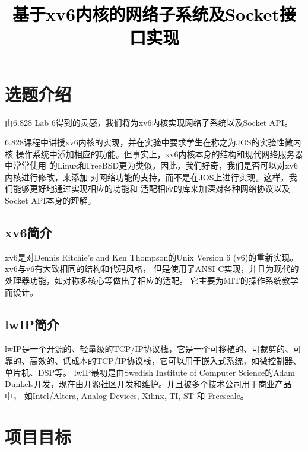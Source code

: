 \documentclass[a4paper,twoside]{article}
\newcommand{\PaperTitle}{基于xv6内核的网络子系统及Socket接口实现}  %
\begin{document}
\newpage

\title{
	\Large{\textcolor{black}{\PaperTitle}}
}
	
	
\maketitle
	
\tableofcontents
 
\newpage
\setcounter{page}{1}

\begin{spacing}{1.2}

\section{选题介绍}

由6.828 Lab 6\cite{kaashoek20066}得到的灵感，我们将为xv6内核实现网络子系统以及Socket API。

6.828课程中讲授xv6内核\cite{cox2011xv6}的实现，并在实验中要求学生在称之为JOS的实验性微内核
操作系统中添加相应的功能。但事实上，xv6内核本身的结构和现代网络服务器中常常使用
的Linux和FreeBSD更为类似。因此，我们好奇，我们是否可以对xv6内核进行修改，来添加
对网络功能的支持，而不是在JOS上进行实现。这样，我们能够更好地通过实现相应的功能和
适配相应的库来加深对各种网络协议以及Socket API本身的理解。


\subsection{xv6简介}

xv6是对Dennis Ritchie's and Ken Thompson的Unix
Version 6 (v6)的重新实现。xv6与v6有大致相同的结构和代码风格，
但是使用了ANSI C实现，并且为现代的处理器功能，如对称多核心等做出了相应的适配。
它主要为MIT的操作系统教学而设计。

\subsection{lwIP简介}

lwIP\cite{dunkels2001design}是一个开源的、轻量级的TCP/IP协议栈，它是一个可移植的、可裁剪的、可靠的、高效的、低成本的TCP/IP协议栈，它可以用于嵌入式系统，如微控制器、单片机、DSP等。
lwIP最初是由Swedish Institute of Computer Science的Adam Dunkels开发，现在由开源社区开发和维护。并且被多个技术公司用于商业产品中，
如Intel/Altera, Analog Devices, Xilinx, TI, ST 和 Freescale。

\section{项目目标}


\end{spacing}
\end{document}
